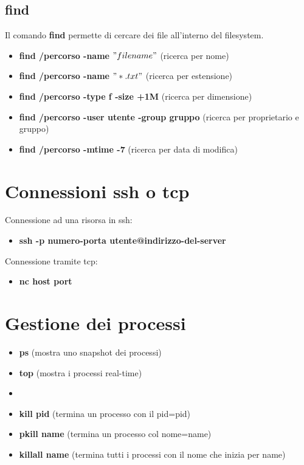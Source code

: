 \documentclass[oneside,a4paper,11pt]{book}
\theoremstyle{italicstyle}
\theoremstyle{normStyle}
\begin{document}
\subsection{find}
Il comando \textbf{find} permette di cercare dei file all'interno del filesystem.

\begin{itemize}
    \item \textbf{find /percorso -name $"filename"$} (ricerca per nome)
    \item \textbf{find /percorso -name $"*.txt"$} (ricerca per estensione)
    \item \textbf{find /percorso -type f -size +1M} (ricerca per dimensione)
    \item \textbf{find /percorso -user utente -group gruppo} (ricerca per proprietario e gruppo)
    \item \textbf{find /percorso -mtime -7} (ricerca per data di modifica)
\end{itemize}

\section{Connessioni ssh o tcp}
Connessione ad una risorsa in ssh:

\begin{itemize}
    \item \textbf{ssh -p numero-porta utente@indirizzo-del-server}
\end{itemize}

Connessione tramite tcp:

\begin{itemize}
    \item \textbf{nc host port}
\end{itemize}

\section{Gestione dei processi}
\begin{itemize}
    \item \textbf{ps} (mostra uno snapshot dei processi)
    \item \textbf{top} (mostra i processi real-time)\item \textbf{}
    \item \textbf{kill pid} (termina un processo con il pid=pid)
    \item \textbf{pkill name} (termina un processo col nome=name)
    \item \textbf{killall name} (termina tutti i processi con il nome che inizia per name)
\end{itemize}


\end{document}
